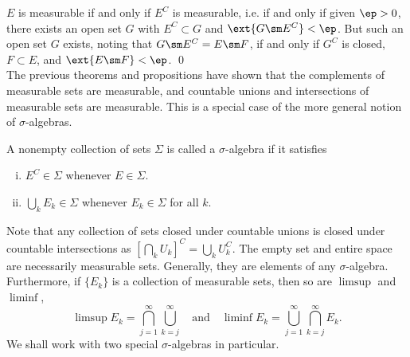 \pf $E$ is measurable if and only if $E^C$ is measurable, i.e. if and only if given $\ep>0$, there exists an open set $G$ with $E^C \subset G$ and $\ext{G \sm E^C}<\ep$. But such an open set $G$ exists, noting that $G \sm E^C=E \sm F$, if and only if $G^C$ is closed, $F \subset E$, and $\ext{E \sm F}<\ep$. \qed \\












































The previous theorems and propositions have shown that the complements of measurable sets are measurable, and countable unions and intersections of measurable sets are measurable. This is a special case of the more general notion of $\sigma$-algebras. 

\begin{dfn}
A nonempty collection of sets $\Sigma$ is called a $\sigma$-algebra if it satisfies
	\begin{enumerate}[(i)]
	\item $E^C \in \Sigma$ whenever $E \in \Sigma$.
	\item $\bigcup_k E_k \in \Sigma$ whenever $E_k \in \Sigma$ for all $k$. 
	\end{enumerate}
\end{dfn}


Note that any collection of sets closed under countable unions is closed under countable intersections as $\left[\bigcap_k U_k \right]^C= \bigcup_k U_k^C$. The empty set and entire space are necessarily measurable sets. Generally, they are elements of any $\sigma$-algebra. Furthermore, if $\{E_k\}$ is a collection of measurable sets, then so are $\limsup$ and $\liminf$,
	\[
	\limsup E_k= \bigcap_{j=1}^\infty \bigcup_{k=j}^\infty \quad\text{and}\quad \liminf E_k= \bigcup_{j=1}^\infty \bigcap_{k=j}^\infty E_k.
	\]
We shall work with two special $\sigma$-algebras in particular.



